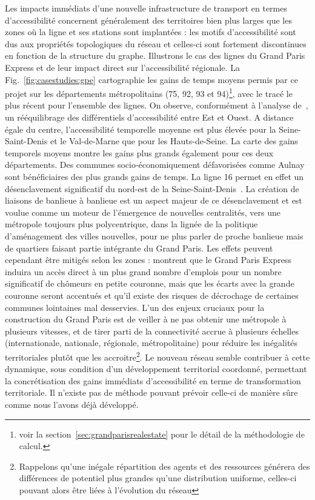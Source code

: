 Les impacts immédiats d'une nouvelle infrastructure de transport en termes d'accessibilité concernent généralement des territoires bien plus larges que les zones où la ligne et ses stations sont implantées : les motifs d'accessibilité sont dus aux propriétés topologiques du réseau et celles-ci sont fortement discontinues en fonction de la structure du graphe. Illustrons le cas des lignes du Grand Paris Express et de leur impact direct sur l'accessibilité régionale. La Fig.~\ref{fig:casestudies:gpe} cartographie les gains de temps moyens permis par ce projet sur les départements métropolitains (75, 92, 93 et 94)\footnote{voir la section~\ref{sec:grandparisrealestate} pour le détail de la méthodologie de calcul.}, avec le tracé le plus récent pour l'ensemble des lignes. On observe, conformément à l'analyse de~\cite{beaucire2013grand}, un rééquilibrage des différentiels d'accessibilité entre Est et Ouest. A distance égale du centre, l'accessibilité temporelle moyenne est plus élevée pour la Seine-Saint-Denis et le Val-de-Marne que pour les Hauts-de-Seine. La carte des gains temporels moyens montre les gains plus grands également pour ces deux départements. Des communes socio-économiquement défavorisées comme Aulnay sont bénéficiaires des plus grands gains de temps. La ligne 16 permet en effet un désenclavement significatif du nord-est de la Seine-Saint-Denis~\cite{desjardins2016grand}. La création de liaisons de banlieue à banlieue est un aspect majeur de ce désenclavement et est voulue comme un moteur de l'émergence de nouvelles centralités, vers une métropole toujours plus polycentrique, dans la lignée de la politique d'aménagement des villes nouvelles, pour ne plus parler de proche banlieue mais de quartiers faisant partie intégrante du Grand Paris. Les effets peuvent cependant être mitigés selon les zones : \cite{l2013grand} montrent que le Grand Paris Express induira un accès direct à un plus grand nombre d'emplois pour un nombre significatif de chômeurs en petite couronne, mais que les écarts avec la grande couronne seront accentués et qu'il existe des risques de décrochage de certaines communes lointaines mal desservies. L'un des enjeux cruciaux pour la construction du Grand Paris est de veiller à ne pas obtenir une métropole à plusieurs vitesses, et de tirer parti de la connectivité accrue à plusieurs échelles (internationale, nationale, régionale, métropolitaine) pour réduire les inégalités territoriales plutôt que les accroitre\footnote{Rappelons qu'une inégale répartition des agents et des ressources générera des différences de potentiel plus grandes qu'une distribution uniforme, celles-ci pouvant alors être liées à l'évolution du réseau}. Le nouveau réseau semble contribuer à cette dynamique, sous condition d'un développement territorial coordonné, permettant la concrétisation des gains immédiats d'accessibilité en terme de transformation territoriale. Il n'existe pas de méthode pouvant prévoir celle-ci de manière sûre comme nous l'avons déjà développé.




